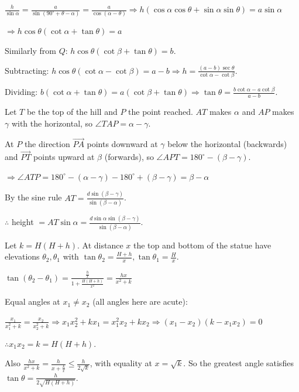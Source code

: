   $\frac{h}{\sin\alpha} = \frac{a}{\sin(90^\circ + \theta - \alpha)} = \frac{a}{\cos(\alpha - \theta)}\Rightarrow
  h(\cos\alpha\cos\theta + \sin\alpha\sin\theta) = a\sin\alpha$

  $\Rightarrow h\cos\theta(\cot\alpha + \tan\theta) = a$

  Similarly from $Q$: $h\cos\theta(\cot\beta + \tan\theta) = b$.

  Subtracting: $h\cos\theta(\cot\alpha - \cot\beta) = a - b\Rightarrow h = \frac{(a - b)\sec\theta}{\cot\alpha -
  \cot\beta}$.

  Dividing: $b(\cot\alpha + \tan\theta) = a(\cot\beta + \tan\theta)\Rightarrow \tan\theta = \frac{b\cot\alpha -
  a\cot\beta}{a - b}$.
\item Let $T$ be the top of the hill and $P$ the point reached. $AT$ makes $\alpha$ and $AP$ makes $\gamma$ with
  the horizontal, so $\angle TAP = \alpha - \gamma$.

  At $P$ the direction $\overrightarrow{PA}$ points downward at $\gamma$ below the horizontal (backwards) and
  $\overrightarrow{PT}$ points upward at $\beta$ (forwards), so $\angle APT = 180^\circ - (\beta - \gamma)$.

  $\Rightarrow \angle ATP = 180^\circ - (\alpha - \gamma) - 180^\circ + (\beta - \gamma) = \beta - \alpha$

  By the sine rule $AT = \frac{d\sin(\beta - \gamma)}{\sin(\beta - \alpha)}$.

  $\therefore$ height $= AT\sin\alpha = \frac{d\sin\alpha\sin(\beta - \gamma)}{\sin(\beta - \alpha)}$.
\item Let $k = H(H + h)$. At distance $x$ the top and bottom of the statue have elevations $\theta_2,
  \theta_1$ with $\tan\theta_2 = \frac{H + h}{x}, \tan\theta_1 = \frac{H}{x}$.

  $\tan(\theta_2 - \theta_1) = \frac{\frac{h}{x}}{1 + \frac{H(H + h)}{x^2}} = \frac{hx}{x^2 + k}$

  Equal angles at $x_1\neq x_2$ (all angles here are acute):

  $\frac{x_1}{x_1^2 + k} = \frac{x_2}{x_2^2 + k}\Rightarrow x_1x_2^2 + kx_1 = x_1^2x_2 + kx_2\Rightarrow (x_1 -
  x_2)(k - x_1x_2) = 0$

  $\therefore x_1x_2 = k = H(H + h)$.

  Also $\frac{hx}{x^2 + k} = \frac{h}{x + \frac{k}{x}}\leq\frac{h}{2\sqrt{k}}$, with equality at $x = \sqrt{k}$.
  So the greatest angle satisfies $\tan\theta = \frac{h}{2\sqrt{H(H + h)}}$.

